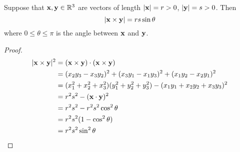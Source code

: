 \documentclass[10pt, a4paper]{article}
\begin{document}
\begin{lemma}
    Suppose that $\mathbf{x, y} \in \mathbb{R} ^ 3$ are vectors of length $|\mathbf{x}| = r > 0$, $|\mathbf{y}| = s > 0$. Then
    \[
    |\mathbf{x \times y}| = rs\sin\theta
    \]
    where $0 \leq \theta \leq \pi$ is the angle between $\mathbf{x}$ and $\mathbf{y}$.
    
    \begin{proof}
        \begin{align*}
            |\mathbf{x\times y}| ^ 2 &= (\mathbf{x} \times \mathbf{y}) \cdot (\mathbf{x} \times \mathbf{y}) \\
            &= (x_2y_3 - x_3y_2) ^ 2 + (x_3y_1 - x_1y_3) ^ 2 + (x_1y_2 - x_2y_1) ^ 2 \\
            &= (x_1 ^ 2 + x_2 ^ 2 + x_3 ^ 2)(y_1 ^ 2 + y_2 ^ 2 + y_3 ^ 2) - (x_1y_1 + x_2y_2 + x_3y_3) ^ 2 \\
            &= r ^ 2 s ^ 2 - (\mathbf{x \cdot y}) ^ 2 \\
            &= r ^ 2 s ^ 2 - r ^ 2 s ^ 2 \cos ^ 2\theta \\ 
            &= r ^ 2 s ^ 2 (1 - \cos ^ 2\theta) \\ 
            &= r ^ 2 s ^ 2 \sin ^ 2 \theta 
        \end{align*}
    \end{proof}
\end{lemma}
\end{document}
